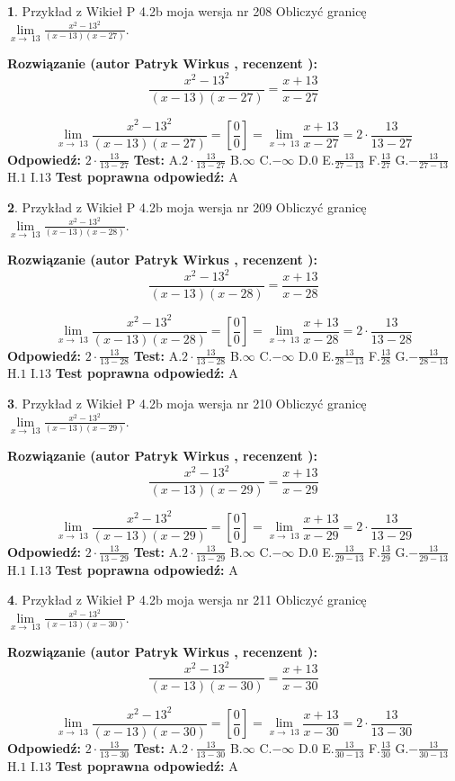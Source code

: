 \documentclass[12pt, a4paper]{article}
\theoremstyle{definition} %
\newtheorem{zad}{}
\newcommand{\zadStart}[1]{\begin{zad}#1\newline}
\newcommand{\zadStop}{\end{zad}}
\newcommand{\rozwStart}[2]{\noindent \textbf{Rozwiązanie (autor #1 , recenzent #2): }\newline}
\newcommand{\rozwStop}{\newline}
\newcommand{\odpStart}{\noindent \textbf{Odpowiedź:}\newline}
\newcommand{\odpStop}{\newline}
\newcommand{\testStart}{\noindent \textbf{Test:}\newline}
\newcommand{\testStop}{\newline}
\newcommand{\kluczStart}{\noindent \textbf{Test poprawna odpowiedź:}\newline}
\newcommand{\kluczStop}{\newline}
\begin{document}
\zadStart{Przykład z Wikieł P 4.2b moja wersja nr 208}
Obliczyć granicę $\lim\limits_{x\to\ 13}\frac{x^{2}-13^{2}}{(x-13)(x-27)}$.
\zadStop
\rozwStart{Patryk Wirkus}{}
$$\frac{x^{2}-13^{2}}{(x-13)(x-27)}=\frac{x+13}{x-27}$$

$$\lim\limits_{x\to\ 13}\frac{x^{2}-13^{2}}{(x-13)(x-27)}=[\frac{0}{0}]=\lim\limits_{x\to\ 13}\frac{x+13}{x-27}=2 \cdot \frac{13}{13-27}$$
\rozwStop
\odpStart
$2 \cdot \frac{13}{13-27}$
\odpStop
\testStart
A.$2 \cdot \frac{13}{13-27}$
B.$\infty$
C.$-\infty$
D.$0$
E.$\frac{13}{27-13}$
F.$\frac{13}{27}$
G.$-\frac{13}{27-13}$
H.$1$
I.$13$
\testStop
\kluczStart
A
\kluczStop



\zadStart{Przykład z Wikieł P 4.2b moja wersja nr 209}
Obliczyć granicę $\lim\limits_{x\to\ 13}\frac{x^{2}-13^{2}}{(x-13)(x-28)}$.
\zadStop
\rozwStart{Patryk Wirkus}{}
$$\frac{x^{2}-13^{2}}{(x-13)(x-28)}=\frac{x+13}{x-28}$$

$$\lim\limits_{x\to\ 13}\frac{x^{2}-13^{2}}{(x-13)(x-28)}=[\frac{0}{0}]=\lim\limits_{x\to\ 13}\frac{x+13}{x-28}=2 \cdot \frac{13}{13-28}$$
\rozwStop
\odpStart
$2 \cdot \frac{13}{13-28}$
\odpStop
\testStart
A.$2 \cdot \frac{13}{13-28}$
B.$\infty$
C.$-\infty$
D.$0$
E.$\frac{13}{28-13}$
F.$\frac{13}{28}$
G.$-\frac{13}{28-13}$
H.$1$
I.$13$
\testStop
\kluczStart
A
\kluczStop



\zadStart{Przykład z Wikieł P 4.2b moja wersja nr 210}
Obliczyć granicę $\lim\limits_{x\to\ 13}\frac{x^{2}-13^{2}}{(x-13)(x-29)}$.
\zadStop
\rozwStart{Patryk Wirkus}{}
$$\frac{x^{2}-13^{2}}{(x-13)(x-29)}=\frac{x+13}{x-29}$$

$$\lim\limits_{x\to\ 13}\frac{x^{2}-13^{2}}{(x-13)(x-29)}=[\frac{0}{0}]=\lim\limits_{x\to\ 13}\frac{x+13}{x-29}=2 \cdot \frac{13}{13-29}$$
\rozwStop
\odpStart
$2 \cdot \frac{13}{13-29}$
\odpStop
\testStart
A.$2 \cdot \frac{13}{13-29}$
B.$\infty$
C.$-\infty$
D.$0$
E.$\frac{13}{29-13}$
F.$\frac{13}{29}$
G.$-\frac{13}{29-13}$
H.$1$
I.$13$
\testStop
\kluczStart
A
\kluczStop



\zadStart{Przykład z Wikieł P 4.2b moja wersja nr 211}
Obliczyć granicę $\lim\limits_{x\to\ 13}\frac{x^{2}-13^{2}}{(x-13)(x-30)}$.
\zadStop
\rozwStart{Patryk Wirkus}{}
$$\frac{x^{2}-13^{2}}{(x-13)(x-30)}=\frac{x+13}{x-30}$$

$$\lim\limits_{x\to\ 13}\frac{x^{2}-13^{2}}{(x-13)(x-30)}=[\frac{0}{0}]=\lim\limits_{x\to\ 13}\frac{x+13}{x-30}=2 \cdot \frac{13}{13-30}$$
\rozwStop
\odpStart
$2 \cdot \frac{13}{13-30}$
\odpStop
\testStart
A.$2 \cdot \frac{13}{13-30}$
B.$\infty$
C.$-\infty$
D.$0$
E.$\frac{13}{30-13}$
F.$\frac{13}{30}$
G.$-\frac{13}{30-13}$
H.$1$
I.$13$
\testStop
\kluczStart
A
\kluczStop
\end{document}
